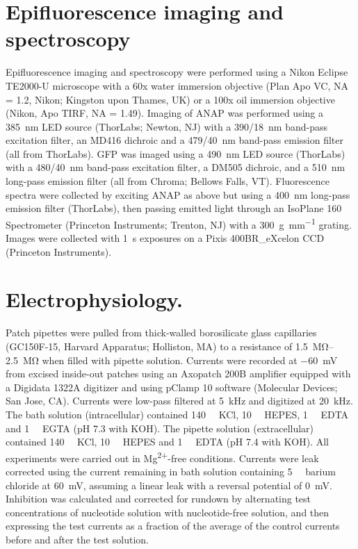 \section{Epifluorescence imaging and spectroscopy}
Epifluorescence imaging and spectroscopy were performed using a Nikon Eclipse TE2000-U microscope with a 60x water immersion objective (Plan Apo VC, NA = 1.2, Nikon; Kingston upon Thames, UK) or a 100x oil immersion objective (Nikon, Apo TIRF, NA = 1.49).
Imaging of ANAP was performed using a \SI{385}{\nano\metre} LED source (ThorLabs; Newton, NJ) with a \SI{390/18}{\nano\metre} band-pass excitation filter, an MD416 dichroic and a \SI{479/40}{\nano\metre} band-pass emission filter (all from ThorLabs).
GFP was imaged using a \SI{490}{\nano\metre} LED source (ThorLabs) with a \SI{480/40}{\nano\metre} band-pass excitation filter, a DM505 dichroic, and a \SI{510}{\nano\metre} long-pass emission filter (all from Chroma; Bellows Falls, VT).
Fluorescence spectra were collected by exciting ANAP as above but using a \SI{400}{\nano\metre} long-pass emission filter (ThorLabs), then passing emitted light through an IsoPlane 160 Spectrometer (Princeton Instruments; Trenton, NJ) with a \SI{300}{\gram\per\milli\metre} grating.
Images were collected with \SI{1}{\second} exposures on a Pixis 400BR\_eXcelon CCD (Princeton Instruments).

\section{Electrophysiology.}
Patch pipettes were pulled from thick-walled borosilicate glass capillaries (GC150F-15, Harvard Apparatus; Holliston, MA) to a resistance of \SIrange{1.5}{2.5}{\mega\ohm} when filled with pipette solution.
Currents were recorded at \SI{-60}{\milli\volt} from excised inside-out patches using an Axopatch 200B amplifier equipped with a Digidata 1322A digitizer and using pClamp 10 software (Molecular Devices; San Jose, CA).
Currents were low-pass filtered at \SI{5}{\kilo\hertz} and digitized at \SI{20}{\kilo\hertz}.
The bath solution (intracellular) contained \SI{140}{\milli\Molar} KCl, \SI{10}{\milli\Molar} HEPES, \SI{1}{\milli\Molar} EDTA and \SI{1}{\milli\Molar} EGTA (pH 7.3 with KOH).
The pipette solution (extracellular) contained \SI{140}{\milli\Molar} KCl, \SI{10}{\milli\Molar} HEPES and \SI{1}{\milli\Molar} EDTA (pH 7.4 with KOH).
All experiments were carried out in Mg\textsuperscript{2+}-free conditions.
Currents were leak corrected using the current remaining in bath solution containing \SI{5}{\milli\Molar} barium chloride at \SI{+60}{\milli\volt}, assuming a linear leak with a reversal potential of \SI{0}{\milli\volt}.
Inhibition was calculated and corrected for rundown by alternating test concentrations of nucleotide solution with nucleotide-free solution, and then expressing the test currents as a fraction of the average of the control currents before and after the test solution.

